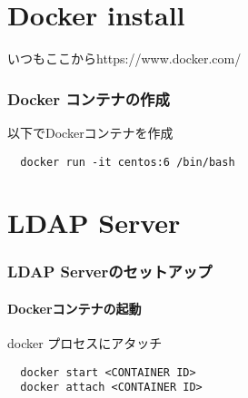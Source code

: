 \part{Docker install}
いつもここからhttps://www.docker.com/
\section{Docker コンテナの作成}
以下でDockerコンテナを作成\\
\begin{verbatim}
  docker run -it centos:6 /bin/bash
\end{verbatim}


\part{LDAP Server}
\section{LDAP Serverのセットアップ}
\subsection{Dockerコンテナの起動}
docker プロセスにアタッチ
\begin{verbatim}
  docker start <CONTAINER ID>
  docker attach <CONTAINER ID>
\end{verbatim}
